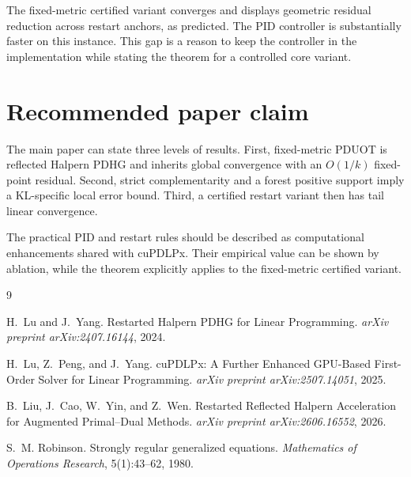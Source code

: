 \documentclass[11pt]{article}
\begin{document}
The fixed-metric certified variant converges and displays geometric residual reduction across restart anchors, as predicted.
The PID controller is substantially faster on this instance.
This gap is a reason to keep the controller in the implementation while stating the theorem for a controlled core variant.

\section{Recommended paper claim}

The main paper can state three levels of results.
First, fixed-metric PDUOT is reflected Halpern PDHG and inherits global convergence with an $O(1/k)$ fixed-point residual.
Second, strict complementarity and a forest positive support imply a KL-specific local error bound.
Third, a certified restart variant then has tail linear convergence.

The practical PID and restart rules should be described as computational enhancements shared with cuPDLPx.
Their empirical value can be shown by ablation, while the theorem explicitly applies to the fixed-metric certified variant.

\begin{thebibliography}{9}

H.~Lu and J.~Yang.
\newblock Restarted Halpern PDHG for Linear Programming.
\newblock \emph{arXiv preprint arXiv:2407.16144}, 2024.

H.~Lu, Z.~Peng, and J.~Yang.
\newblock cuPDLPx: A Further Enhanced GPU-Based First-Order Solver for Linear Programming.
\newblock \emph{arXiv preprint arXiv:2507.14051}, 2025.

B.~Liu, J.~Cao, W.~Yin, and Z.~Wen.
\newblock Restarted Reflected Halpern Acceleration for Augmented Primal--Dual Methods.
\newblock \emph{arXiv preprint arXiv:2606.16552}, 2026.

S.~M. Robinson.
\newblock Strongly regular generalized equations.
\newblock \emph{Mathematics of Operations Research}, 5(1):43--62, 1980.

\end{thebibliography}
\end{document}

